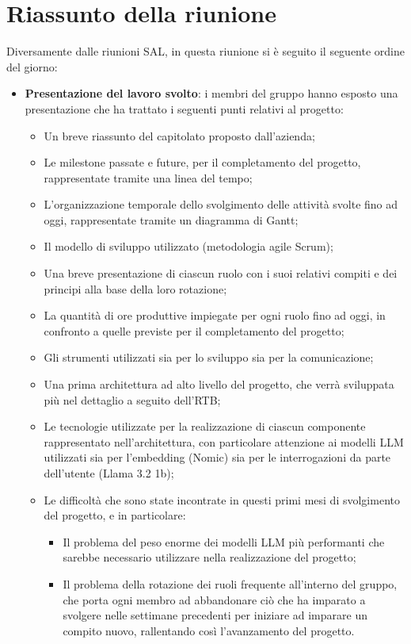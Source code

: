 \section{Riassunto della riunione}
Diversamente dalle riunioni SAL, in questa riunione si è seguito il seguente ordine del giorno:
\begin{itemize}
    \item \textbf{Presentazione del lavoro svolto}: i membri del gruppo hanno esposto una presentazione che ha trattato i seguenti punti relativi al progetto:
    \begin{itemize}
        \item Un breve riassunto del capitolato proposto dall'azienda;
        \item Le milestone passate e future, per il completamento del progetto, rappresentate tramite una linea del tempo;
        \item L'organizzazione temporale dello svolgimento delle attività svolte fino ad oggi, rappresentate tramite un diagramma di Gantt;
        \item Il modello di sviluppo utilizzato (metodologia agile Scrum);
        \item Una breve presentazione di ciascun ruolo con i suoi relativi compiti e dei principi alla base della loro rotazione;
        \item La quantità di ore produttive impiegate per ogni ruolo fino ad oggi, in confronto a quelle previste per il completamento del progetto;
        \item Gli strumenti utilizzati sia per lo sviluppo sia per la comunicazione;
        \item Una prima architettura ad alto livello del progetto, che verrà sviluppata più nel dettaglio a seguito dell'RTB;
        \item Le tecnologie utilizzate per la realizzazione di ciascun componente rappresentato nell'architettura, con particolare attenzione ai modelli LLM utilizzati sia per l'embedding (Nomic) sia per le interrogazioni da parte dell'utente (Llama 3.2 1b);
        \item Le difficoltà che sono state incontrate in questi primi mesi di svolgimento del progetto, e in particolare:
        \begin{itemize}
            \item Il problema del peso enorme dei modelli LLM più performanti che sarebbe necessario utilizzare nella realizzazione del progetto;
            \item Il problema della rotazione dei ruoli frequente all'interno del gruppo, che porta ogni membro ad abbandonare ciò che ha imparato a svolgere nelle settimane precedenti per iniziare ad imparare un compito nuovo, rallentando così l'avanzamento del progetto.

\end{itemize}
\end{itemize}
\end{itemize}
